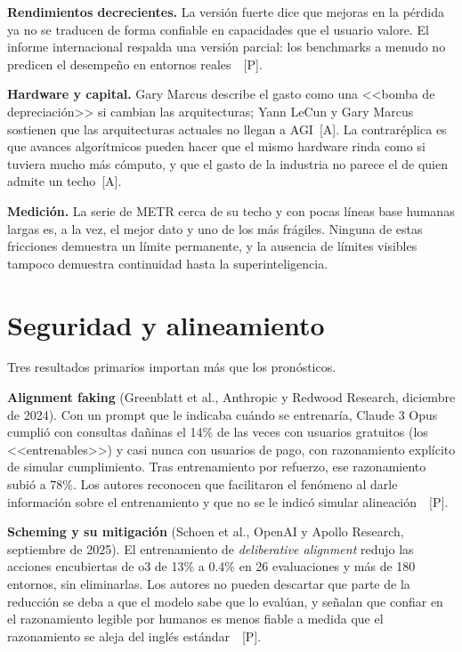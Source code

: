 \documentclass[10pt]{article}
\newcommand{\tP}{\textsf{\small[P]}}
\newcommand{\tA}{\textsf{\small[A]}}
\begin{document}
\textbf{Rendimientos decrecientes.} La versi\'on fuerte dice que mejoras en la p\'erdida ya no se traducen de forma confiable en capacidades que el usuario valore. El informe internacional respalda una versi\'on parcial: los benchmarks a menudo no predicen el desempe\~no en entornos reales~\cite{iasr2026}~\tP.

\textbf{Hardware y capital.} Gary Marcus describe el gasto como una <<bomba de depreciaci\'on>> si cambian las arquitecturas; Yann LeCun y Gary Marcus sostienen que las arquitecturas actuales no llegan a AGI~\tA. La contra\-r\'eplica es que avances algor\'itmicos pueden hacer que el mismo hardware rinda como si tuviera mucho m\'as c\'omputo, y que el gasto de la industria no parece el de quien admite un techo~\tA.

\textbf{Medici\'on.} La serie de METR cerca de su techo y con pocas l\'ineas base humanas largas es, a la vez, el mejor dato y uno de los m\'as fr\'agiles. Ninguna de estas fricciones demuestra un l\'imite permanente, y la ausencia de l\'imites visibles tampoco demuestra continuidad hasta la superinteligencia.

\section{Seguridad y alineamiento}

Tres resultados primarios importan m\'as que los pron\'osticos.

\textbf{Alignment faking} (Greenblatt et al., Anthropic y Redwood Research, diciembre de 2024). Con un prompt que le indicaba cu\'ando se entrenar\'ia, Claude 3 Opus cumpli\'o con consultas da\~ninas el 14\% de las veces con usuarios gratuitos (los <<entrenables>>) y casi nunca con usuarios de pago, con razonamiento expl\'icito de simular cumplimiento. Tras entrenamiento por refuerzo, ese razonamiento subi\'o a 78\%. Los autores reconocen que facilitaron el fen\'omeno al darle informaci\'on sobre el entrenamiento y que no se le indic\'o simular alineaci\'on~\cite{greenblatt2024}~\tP.

\textbf{Scheming y su mitigaci\'on} (Schoen et al., OpenAI y Apollo Research, septiembre de 2025). El entrenamiento de \emph{deliberative alignment} redujo las acciones encubiertas de o3 de 13\% a 0.4\% en 26 evaluaciones y m\'as de 180 entornos, sin eliminarlas. Los autores no pueden descartar que parte de la reducci\'on se deba a que el modelo sabe que lo eval\'uan, y se\~nalan que confiar en el razonamiento legible por humanos es menos fiable a medida que el razonamiento se aleja del ingl\'es est\'andar~\cite{schoen2025}~\tP.
\end{document}
